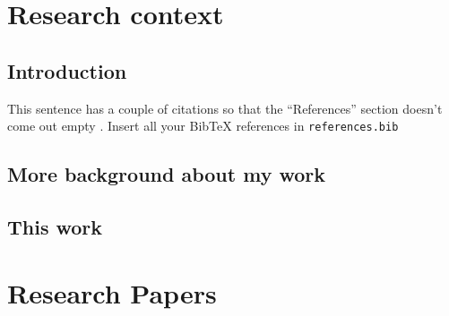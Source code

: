 \documentclass[11pt]{book}
\begin{document}
%
%
\part{Research context}



\setcounter{page}{1}  %
\chapter{Introduction}

This sentence has a couple of citations so that the ``References'' section doesn't come out empty \citep{Carrera_2015,Carrera_2016}. Insert all your BibTeX references in \texttt{references.bib}

\blindtext



\chapter{More background about my work}


\blindtext



\chapter{This work}


\blindtext





\part{Research Papers}

\end{document}
